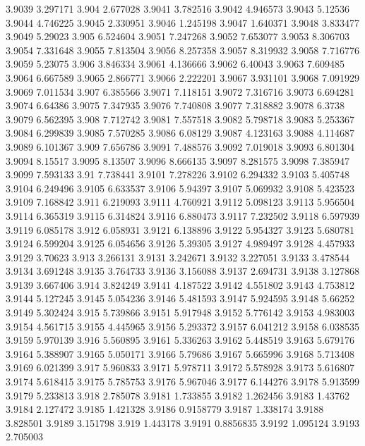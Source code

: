 3.9039  3.297171
3.904  2.677028
3.9041  3.782516
3.9042  4.946573
3.9043  5.12536
3.9044  4.746225
3.9045  2.330951
3.9046  1.245198
3.9047  1.640371
3.9048  3.833477
3.9049  5.29023
3.905  6.524604
3.9051  7.247268
3.9052  7.653077
3.9053  8.306703
3.9054  7.331648
3.9055  7.813504
3.9056  8.257358
3.9057  8.319932
3.9058  7.716776
3.9059  5.23075
3.906  3.846334
3.9061  4.136666
3.9062  6.40043
3.9063  7.609485
3.9064  6.667589
3.9065  2.866771
3.9066  2.222201
3.9067  3.931101
3.9068  7.091929
3.9069  7.011534
3.907  6.385566
3.9071  7.118151
3.9072  7.316716
3.9073  6.694281
3.9074  6.64386
3.9075  7.347935
3.9076  7.740808
3.9077  7.318882
3.9078  6.3738
3.9079  6.562395
3.908  7.712742
3.9081  7.557518
3.9082  5.798718
3.9083  5.253367
3.9084  6.299839
3.9085  7.570285
3.9086  6.08129
3.9087  4.123163
3.9088  4.114687
3.9089  6.101367
3.909  7.656786
3.9091  7.488576
3.9092  7.019018
3.9093  6.801304
3.9094  8.15517
3.9095  8.13507
3.9096  8.666135
3.9097  8.281575
3.9098  7.385947
3.9099  7.593133
3.91  7.738441
3.9101  7.278226
3.9102  6.294332
3.9103  5.405748
3.9104  6.249496
3.9105  6.633537
3.9106  5.94397
3.9107  5.069932
3.9108  5.423523
3.9109  7.168842
3.911  6.219093
3.9111  4.760921
3.9112  5.098123
3.9113  5.956504
3.9114  6.365319
3.9115  6.314824
3.9116  6.880473
3.9117  7.232502
3.9118  6.597939
3.9119  6.085178
3.912  6.058931
3.9121  6.138896
3.9122  5.954327
3.9123  5.680781
3.9124  6.599204
3.9125  6.054656
3.9126  5.39305
3.9127  4.989497
3.9128  4.457933
3.9129  3.70623
3.913  3.266131
3.9131  3.242671
3.9132  3.227051
3.9133  3.478544
3.9134  3.691248
3.9135  3.764733
3.9136  3.156088
3.9137  2.694731
3.9138  3.127868
3.9139  3.667406
3.914  3.824249
3.9141  4.187522
3.9142  4.551802
3.9143  4.753812
3.9144  5.127245
3.9145  5.054236
3.9146  5.481593
3.9147  5.924595
3.9148  5.66252
3.9149  5.302424
3.915  5.739866
3.9151  5.917948
3.9152  5.776142
3.9153  4.983003
3.9154  4.561715
3.9155  4.445965
3.9156  5.293372
3.9157  6.041212
3.9158  6.038535
3.9159  5.970139
3.916  5.560895
3.9161  5.336263
3.9162  5.448519
3.9163  5.679176
3.9164  5.388907
3.9165  5.050171
3.9166  5.79686
3.9167  5.665996
3.9168  5.713408
3.9169  6.021399
3.917  5.960833
3.9171  5.978711
3.9172  5.578928
3.9173  5.616807
3.9174  5.618415
3.9175  5.785753
3.9176  5.967046
3.9177  6.144276
3.9178  5.913599
3.9179  5.233813
3.918  2.785078
3.9181  1.733855
3.9182  1.262456
3.9183  1.43762
3.9184  2.127472
3.9185  1.421328
3.9186  0.9158779
3.9187  1.338174
3.9188  3.828501
3.9189  3.151798
3.919  1.443178
3.9191  0.8856835
3.9192  1.095124
3.9193  2.705003
